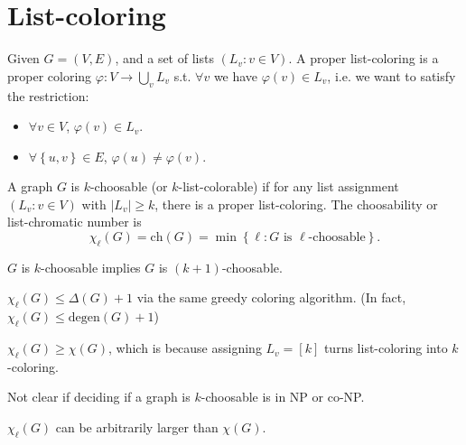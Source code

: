 \section{List-coloring}
Given \(G = (V, E)\), and a set of lists \((L_v: v \in V)\). A proper list-coloring is a proper coloring \(\varphi :V \to \bigcup_{v} L_v \) s.t. \(\forall v\) we have \(\varphi (v) \in L_v\), i.e. we want to satisfy the restriction:
\begin{itemize}
    \item \(\forall v \in V\), \(\varphi (v) \in L_v\). 
    \item \(\forall \left\{ u, v \right\} \in E\), \(\varphi (u) \neq \varphi (v)\).     
\end{itemize}     

\begin{definition}
    A graph \(G\) is \(k\)-choosable (or \(k\)-list-colorable) if for any list assignment \((L_v: v \in V)\) with \(\vert L_v \vert \ge k \), there is a proper list-coloring. The choosability or list-chromatic number is 
    \[
        \chi_{\ell} (G) = \mathrm{ch}(G) = \min \left\{ \ell : G \text{ is } \ell \text{-choosable}   \right\}.  
    \]
\end{definition}

\begin{observation}
    \(G\) is \(k\)-choosable implies \(G\) is \((k + 1)\)-choosable.    
\end{observation}

\begin{remark}
    \(\chi _{\ell} (G) \le \Delta (G) + 1\) via the same greedy coloring algorithm. (In fact, \(\chi _\ell (G) \le \mathrm{degen}(G) + 1 \))  
\end{remark}

\begin{remark}
    \(\chi _\ell (G) \ge \chi (G)\), which is because assigning \(L_v = [k]\) turns list-coloring into \(k\)-coloring.   
\end{remark}

\begin{remark}
    Not clear if deciding if a graph is \(k\)-choosable is in NP or co-NP. 
\end{remark}

\begin{proposition} \label{prop: choosability can be arbitrarily larger than chromatic number}
    \(\chi _\ell (G)\) can be arbitrarily larger than \(\chi (G)\).  
\end{proposition}

